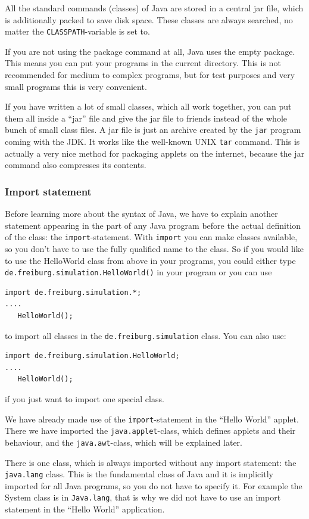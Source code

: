All the standard commands (classes) of Java are stored in a central jar
file, which is additionally packed to save disk space. These classes
are always searched, no matter the \verb|CLASSPATH|-variable is set to.

If you are not using the package command at all, Java uses the empty 
package. This means you can put your programs in the current directory.
This is not recommended for medium to complex programs, but for
test purposes and very small programs this is very convenient.

If you have written a lot of small classes, which all work together, you
can put them all inside a ``jar'' file and give the jar file
to friends instead of the whole bunch of small class files.
A jar file is just an archive created by the \verb|jar| program 
coming with the JDK. It works like the well-known UNIX \verb|tar|
command. This is actually a very nice method for packaging
applets on the internet, because the jar command also compresses
its contents.  

\subsubsection{Import statement}
Before learning more about the syntax of Java, we have to explain another
statement appearing in the part of any Java program before the actual
definition of the class: the \verb|import|-statement. With \verb|import|
you can make classes available, so you don't have to use the fully
qualified name to the class. So if you would like to
use the HelloWorld class from above in your programs, you could either
type \verb|de.freiburg.simulation.HelloWorld()| in your program
or you can use
\begin{verbatim}
import de.freiburg.simulation.*;
....
   HelloWorld();
\end{verbatim}
to import all classes in the \verb|de.freiburg.simulation| class.
You can also use:
\begin{verbatim}
import de.freiburg.simulation.HelloWorld;
....
   HelloWorld();
\end{verbatim}
if you just want to import one special class.

We have already made use of the \verb|import|-statement in the ``Hello World'' 
applet. There we have imported the \verb|java.applet|-class, which
defines applets and their behaviour, and the \verb|java.awt|-class, which
will be explained later.
 
There is one class, which is always imported without any import statement:
the \verb|java.lang| class. This is the fundamental class of Java and it is
implicitly imported for all Java programs, so you do not have to specify
it. For example the System class is in \verb|Java.lang|, that is why
we did not have to use an import statement in the ``Hello World''
application.  


